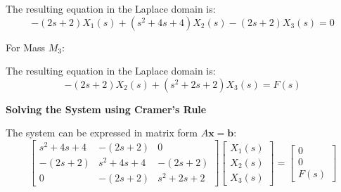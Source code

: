 ﻿\documentclass[11pt]{article}
\begin{document}
The resulting equation in the Laplace domain is:
\begin{equation}
-(2s + 2)X_1(s) + (s^2 + 4s + 4)X_2(s) - (2s + 2)X_3(s) = 0 \tag{2}
\end{equation}

\newpage

\vspace{12pt}
{For Mass $M_3$:}
\begin{figure}[h!]
\centering
{}
\end{figure}

The resulting equation in the Laplace domain is:
\begin{equation}
-(2s + 2)X_2(s) + (s^2 + 2s + 2)X_3(s) = F(s) \tag{3}
\end{equation}

\noindent\textbf{Solving the System using Cramer's Rule}
\vspace{12pt}

The system can be expressed in matrix form $A\mathbf{x} = \mathbf{b}$:
$$
\begin{bmatrix}
s^2 + 4s + 4 & -(2s + 2) & 0 \\
-(2s + 2) & s^2 + 4s + 4 & -(2s + 2) \\
0 & -(2s + 2) & s^2 + 2s + 2
\end{bmatrix}
\begin{bmatrix}
X_1(s) \\
X_2(s) \\
X_3(s)
\end{bmatrix}
=
\begin{bmatrix}
0 \\
0 \\
F(s)
\end{bmatrix}
$$
\end{document}
